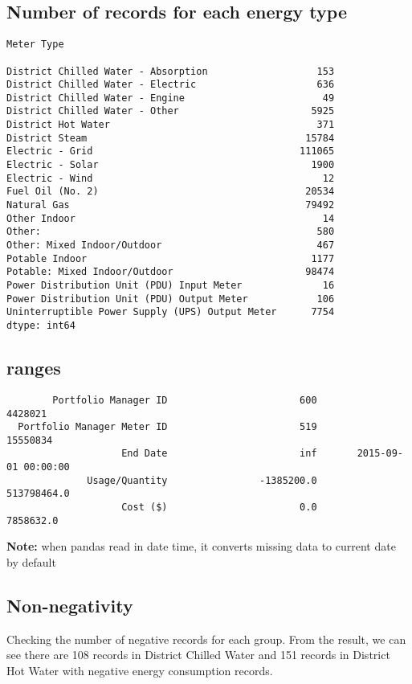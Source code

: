 \documentclass[12pt]{article}
\newcommand{\note}[0]{\textbf{Note: }}
\begin{document}
\subsection{Number of records for each energy type}
\begin{verbatim}
Meter Type

District Chilled Water - Absorption                   153
District Chilled Water - Electric                     636
District Chilled Water - Engine                        49
District Chilled Water - Other                       5925
District Hot Water                                    371
District Steam                                      15784
Electric - Grid                                    111065
Electric - Solar                                     1900
Electric - Wind                                        12
Fuel Oil (No. 2)                                    20534
Natural Gas                                         79492
Other Indoor                                           14
Other:                                                580
Other: Mixed Indoor/Outdoor                           467
Potable Indoor                                       1177
Potable: Mixed Indoor/Outdoor                       98474
Power Distribution Unit (PDU) Input Meter              16
Power Distribution Unit (PDU) Output Meter            106
Uninterruptible Power Supply (UPS) Output Meter      7754
dtype: int64

\end{verbatim}
\subsection{ranges}
\begin{verbatim}
        Portfolio Manager ID                       600                   4428021
  Portfolio Manager Meter ID                       519                  15550834
                    End Date                       inf       2015-09-01 00:00:00
              Usage/Quantity                -1385200.0               513798464.0
                    Cost ($)                       0.0                 7858632.0
\end{verbatim}

\note when pandas read in date time, it converts missing data to
current date by default

\subsection{Non-negativity}
Checking the number of negative records for each group. From the
result, we can see there are 108 records in District Chilled Water and
151 records in District Hot Water with negative energy consumption
records.
\end{document}
